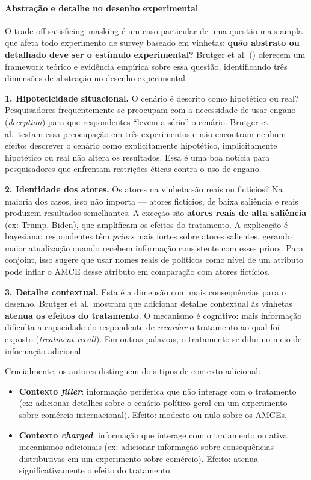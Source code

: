 \documentclass[
]{article}
\providecommand{\tightlist}{%
  \setlength{\itemsep}{0pt}\setlength{\parskip}{0pt}}
\begin{document}
\paragraph{Abstração e detalhe no desenho experimental}\label{abstrauxe7uxe3o-e-detalhe-no-desenho-experimental}

O trade-off satisficing--masking é um caso particular de uma questão mais ampla que afeta todo experimento de survey baseado em vinhetas: \textbf{quão abstrato ou detalhado deve ser o estímulo experimental?} Brutger et al. () oferecem um framework teórico e evidência empírica sobre essa questão, identificando três dimensões de abstração no desenho experimental.

\textbf{1. Hipoteticidade situacional.} O cenário é descrito como hipotético ou real? Pesquisadores frequentemente se preocupam com a necessidade de usar engano (\emph{deception}) para que respondentes ``levem a sério'' o cenário. Brutger et al.~testam essa preocupação em três experimentos e não encontram nenhum efeito: descrever o cenário como explicitamente hipotético, implicitamente hipotético ou real não altera os resultados. Essa é uma boa notícia para pesquisadores que enfrentam restrições éticas contra o uso de engano.

\textbf{2. Identidade dos atores.} Os atores na vinheta são reais ou fictícios? Na maioria dos casos, isso não importa --- atores fictícios, de baixa saliência e reais produzem resultados semelhantes. A exceção são \textbf{atores reais de alta saliência} (ex: Trump, Biden), que amplificam os efeitos do tratamento. A explicação é bayesiana: respondentes têm \emph{priors} mais fortes sobre atores salientes, gerando maior atualização quando recebem informação consistente com esses priors. Para conjoint, isso sugere que usar nomes reais de políticos como nível de um atributo pode inflar o AMCE desse atributo em comparação com atores fictícios.

\textbf{3. Detalhe contextual.} Esta é a dimensão com mais consequências para o desenho. Brutger et al.~mostram que adicionar detalhe contextual às vinhetas \textbf{atenua os efeitos do tratamento}. O mecanismo é cognitivo: mais informação dificulta a capacidade do respondente de \emph{recordar} o tratamento ao qual foi exposto (\emph{treatment recall}). Em outras palavras, o tratamento se dilui no meio de informação adicional.

Crucialmente, os autores distinguem dois tipos de contexto adicional:

\begin{itemize}
\tightlist
\item
  \textbf{Contexto \emph{filler}}: informação periférica que não interage com o tratamento (ex: adicionar detalhes sobre o cenário político geral em um experimento sobre comércio internacional). Efeito: modesto ou nulo sobre os AMCEs.
\item
  \textbf{Contexto \emph{charged}}: informação que interage com o tratamento ou ativa mecanismos adicionais (ex: adicionar informação sobre consequências distributivas em um experimento sobre comércio). Efeito: atenua significativamente o efeito do tratamento.
\end{itemize}
\end{document}
